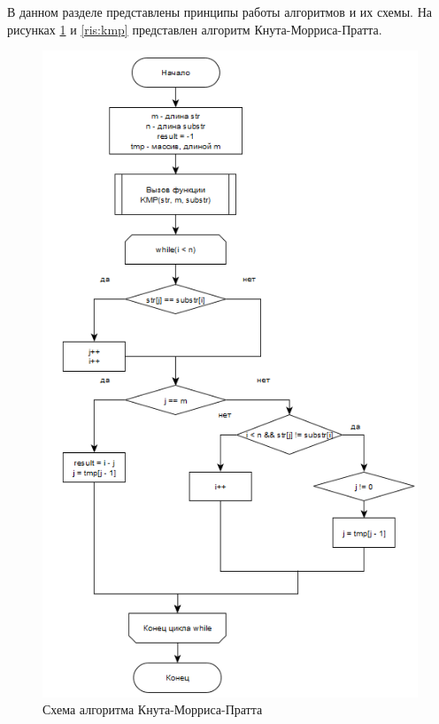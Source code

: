 \documentclass[12pt, a4paper]{report}
\begin{document}
	В данном разделе представлены принципы работы алгоритмов и их схемы.
	На рисунках \ref{ris:first} и \ref{ris:kmp} представлен алгоритм Кнута-Морриса-Пратта.
	\begin{figure}[ht!]
		\centering
		\includegraphics[scale=1.2]{img/first.png}
		\caption{Схема алгоритма Кнута-Морриса-Пратта}
		\label{ris:first}
	\end{figure}\newpage
	
\end{document}
